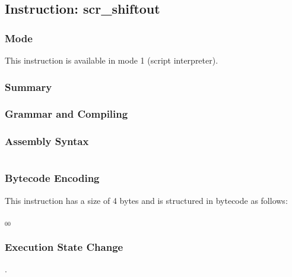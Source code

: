 \subsection{Instruction: scr\_shiftout}

\subsubsection{Mode}
This instruction is available in mode 1 (script interpreter).
\subsubsection{Summary}


\subsubsection{Grammar and Compiling}


\subsubsection{Assembly Syntax}

\begin{myquote}
\begin{verbatim}

\end{verbatim}
\end{myquote}

\subsubsection{Bytecode Encoding}

This instruction has a size of 4 bytes and is structured in bytecode as follows:

$_{00}$\ 

\subsubsection{Execution State Change}

.


